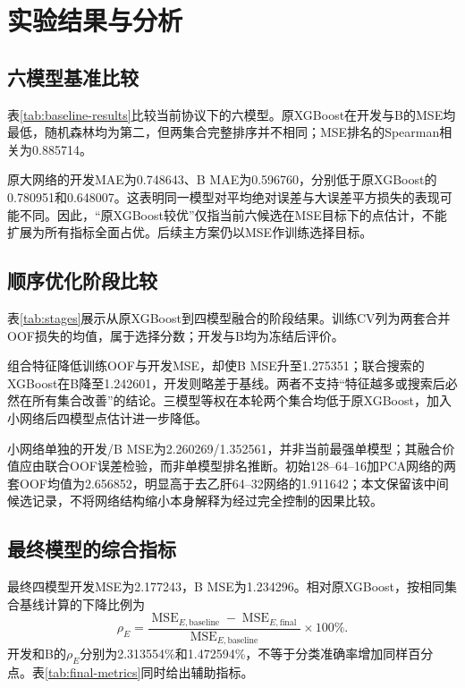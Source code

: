 \section{实验结果与分析}\label{sec:results}

\subsection{六模型基准比较}
表\ref{tab:baseline-results}比较当前协议下的六模型。原XGBoost在开发与B的MSE均最低，随机森林均为第二，但两集合完整排序并不相同；MSE排名的Spearman相关为0.885714。


原大网络的开发MAE为0.748643、B MAE为0.596760，分别低于原XGBoost的0.780951和0.648007。这表明同一模型对平均绝对误差与大误差平方损失的表现可能不同。因此，“原XGBoost较优”仅指当前六候选在MSE目标下的点估计，不能扩展为所有指标全面占优。后续主方案仍以MSE作训练选择目标。

\subsection{顺序优化阶段比较}
表\ref{tab:stages}展示从原XGBoost到四模型融合的阶段结果。训练CV列为两套合并OOF损失的均值，属于选择分数；开发与B均为冻结后评价。


组合特征降低训练OOF与开发MSE，却使B MSE升至1.275351；联合搜索的XGBoost在B降至1.242601，开发则略差于基线。两者不支持“特征越多或搜索后必然在所有集合改善”的结论。三模型等权在本轮两个集合均低于原XGBoost，加入小网络后四模型点估计进一步降低。

小网络单独的开发/B MSE为2.260269/1.352561，并非当前最强单模型；其融合价值应由联合OOF误差检验，而非单模型排名推断。初始128--64--16加PCA网络的两套OOF均值为2.656852，明显高于去乙肝64--32网络的1.911642；本文保留该中间候选记录，不将网络结构缩小本身解释为经过完全控制的因果比较。

\subsection{最终模型的综合指标}
最终四模型开发MSE为2.177243，B MSE为1.234296。相对原XGBoost，按相同集合基线计算的下降比例为
\begin{equation}
\rho_E=\frac{\operatorname{MSE}_{E,\mathrm{baseline}}-
\operatorname{MSE}_{E,\mathrm{final}}}{\operatorname{MSE}_{E,\mathrm{baseline}}}\times100\%.
\label{eq:improvement}
\end{equation}
开发和B的$\rho_E$分别为2.313554\%和1.472594\%，不等于分类准确率增加同样百分点。表\ref{tab:final-metrics}同时给出辅助指标。



